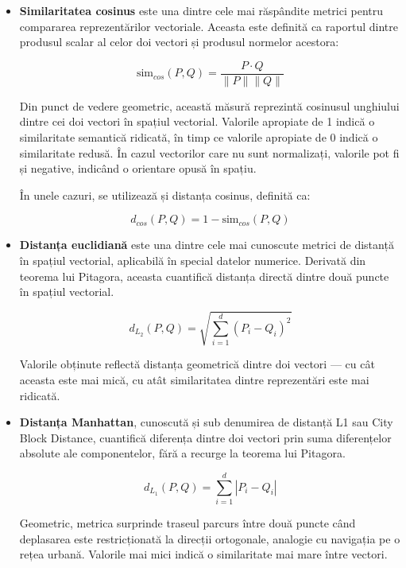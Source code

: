 \documentclass[12pt, a4paper, oneside, romanian]{teza-upb}
\begin{document}
\begin{itemize}
    \item\textbf{Similaritatea cosinus} este una dintre cele mai răspândite metrici pentru compararea reprezentărilor vectoriale. Aceasta este definită ca raportul dintre produsul scalar al celor doi vectori și produsul normelor acestora:

\begin{equation}
\text{sim}_{cos}(P, Q) = \frac{P \cdot Q}{\|P\| \|Q\|}
\end{equation}

Din punct de vedere geometric, această măsură reprezintă cosinusul unghiului dintre cei doi vectori în spațiul vectorial. Valorile apropiate de 1 indică o similaritate semantică ridicată, în timp ce valorile apropiate de 0 indică o similaritate redusă. În cazul vectorilor care nu sunt normalizați, valorile pot fi și negative, indicând o orientare opusă în spațiu. 

În unele cazuri, se utilizează și distanța cosinus, definită ca:

\begin{equation}
d_{cos}(P, Q) = 1 - \text{sim}_{cos}(P, Q)
\end{equation} 

    \item\textbf{Distanța euclidiană} este una dintre cele mai cunoscute metrici de distanță în spațiul vectorial, aplicabilă în special datelor numerice. Derivată din teorema lui Pitagora, aceasta cuantifică distanța directă dintre două puncte în spațiul vectorial.

\begin{equation}
d_{L_2}(P, Q) = \sqrt{\sum_{i=1}^{d} (P_i - Q_i)^2}
\end{equation}

Valorile obținute reflectă distanța geometrică dintre doi vectori — cu cât aceasta este mai mică, cu atât similaritatea dintre reprezentări este mai ridicată.


\item\textbf{Distanța Manhattan}, cunoscută și sub denumirea de distanță L1 sau City Block Distance, cuantifică diferența dintre doi vectori prin suma diferențelor absolute ale componentelor, fără a recurge la teorema lui Pitagora.

\begin{equation}
d_{L_1}(P, Q) = \sum_{i=1}^{d} |P_i - Q_i|
\end{equation}

Geometric, metrica surprinde traseul parcurs între două puncte când deplasarea este restricționată la direcții ortogonale, analogie cu navigația pe o rețea urbană. Valorile mai mici indică o similaritate mai mare între vectori.


\end{itemize}
\end{document}
